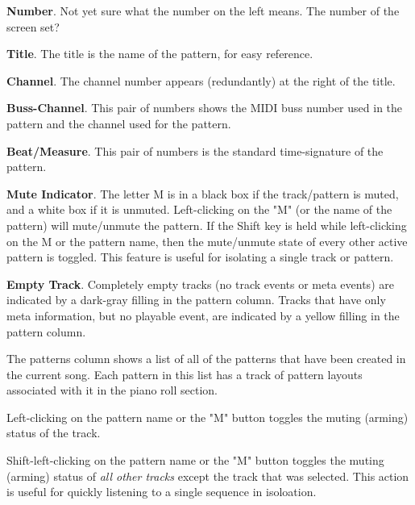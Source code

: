    \begin{enumber}
      \item \textbf{Number}.
         Not yet sure what the number on the left means.
         The number of the screen set?
      \item \textbf{Title}.
         The title is the name of the pattern, for easy reference.
      \item \textbf{Channel}.
         The channel number appears (redundantly)
         at the right of the title.
      \item \textbf{Buss-Channel}.
         This pair of numbers shows the MIDI buss number used in the pattern
         and the channel used for the pattern.
      \item \textbf{Beat/Measure}.
         This pair of numbers is the standard time-signature of the pattern.
      \item \textbf{Mute Indicator}.
         The letter M is in a black box if the track/pattern is muted, and a
         white box if it is unmuted.
         Left-clicking on the "M" (or the name of the pattern)
         will mute/unmute the pattern.
         If the Shift key is held while left-clicking on the M or the pattern
         name, then
         the mute/unmute state of every other active pattern is toggled.
         This feature is useful for isolating a single track or pattern.
      \item \textbf{Empty Track}.
         Completely empty tracks (no track events or meta events)
         are indicated by a dark-gray filling in the pattern column.
         Tracks that have only meta information, but no playable event, are
         indicated by a yellow filling in the pattern column.
   \end{enumber}

   The patterns column shows a list of all of the patterns that have been
   created in the current song.  Each pattern in this list has a track of
   pattern layouts associated with it in the piano roll section.

   Left-clicking on the pattern name or the "M" button toggles the muting
   (arming) status of the track.

   Shift-left-clicking on the pattern name or the "M" button toggles the muting
   (arming) status of \textsl{all other tracks} except the track that was
   selected.  This action is useful for quickly listening to a single sequence
   in isoloation.


